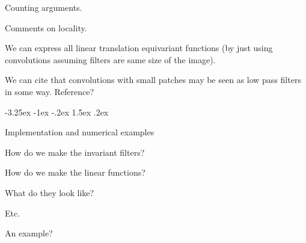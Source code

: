 \documentclass{article}
\makeatletter
\theoremstyle{plain}
\renewcommand\section{\@startsection {section}{1}{\z@}%
  {-3.25ex \@plus -1ex \@minus -.2ex}%
  {1.5ex \@plus .2ex}%
  {\raggedright\normalfont\large\bfseries}}
\makeatother
\begin{document}
Counting arguments.

Comments on locality.

We can express all linear translation equivariant functions (by just using convolutions assuming filters are same size of the image). 

We can cite that convolutions with small patches may be seen as low pass filters in some way. Reference?

\section{Implementation and numerical examples}\label{sec:examples}

How do we make the invariant filters?

How do we make the linear functions?

What do they look like?

Etc.

An example?
\end{document}
